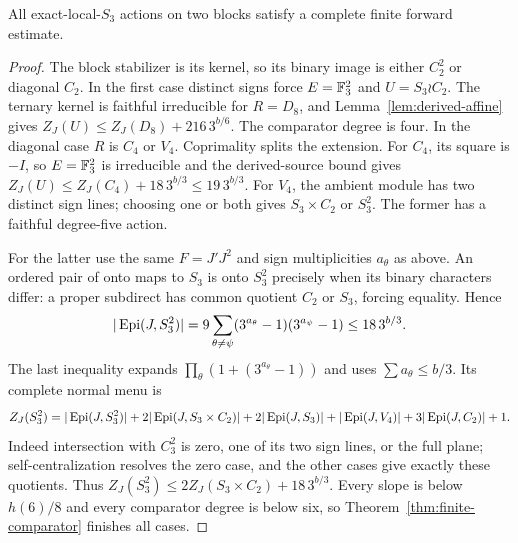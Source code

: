 \begin{proposition}\label{prop:two-s3}
All exact-local-$S_3$ actions on two blocks satisfy a complete finite
forward estimate.
\end{proposition}
\begin{proof}
The block stabilizer is its kernel, so its binary image is either
$C_2^2$ or diagonal $C_2$. In the first case distinct signs force
$E=\mathbb F_3^2$ and $U=S_3\wr C_2$. The ternary kernel is faithful
irreducible for $R=D_8$, and Lemma~\ref{lem:derived-affine} gives
$Z_J(U)\leq Z_J(D_8)+216\,3^{b/6}$. The comparator degree is four.
In the diagonal case $R$ is $C_4$ or $V_4$. Coprimality splits
the extension. For $C_4$, its square is $-I$, so $E=\mathbb F_3^2$ is
irreducible and the derived-source bound gives
$Z_J(U)\leq Z_J(C_4)+18\,3^{b/3}\leq19\,3^{b/3}$.
For $V_4$, the ambient module has two distinct sign lines; choosing
one or both gives $S_3\times C_2$ or $S_3^2$.
The former has a faithful degree-five action.

For the latter use the same $F=J'J^2$ and sign multiplicities
$a_\theta$ as above. An ordered pair of onto maps to $S_3$ is onto
$S_3^2$ precisely when its binary characters differ: a proper
subdirect has common quotient $C_2$ or $S_3$, forcing equality.
Hence
\[
 |\operatorname{Epi}(J,S_3^2)|=9\sum_{\theta\ne\psi}
 (3^{a_\theta}-1)(3^{a_\psi}-1)\leq18\,3^{b/3}.
\]
The last inequality expands $\prod_\theta(1+(3^{a_\theta}-1))$
and uses $\sum a_\theta\leq b/3$. Its complete normal menu is
\[
 Z_J(S_3^2)=|\operatorname{Epi}(J,S_3^2)|+2|\operatorname{Epi}(J,S_3\times C_2)|
 +2|\operatorname{Epi}(J,S_3)|+|\operatorname{Epi}(J,V_4)|+3|\operatorname{Epi}(J,C_2)|+1.
\]
Indeed intersection with $C_3^2$ is zero, one of its two sign
lines, or the full plane; self-centralization resolves the zero
case, and the other cases give exactly these quotients. Thus
$Z_J(S_3^2)\leq2Z_J(S_3\times C_2)+18\,3^{b/3}$.
Every slope is below $h(6)/8$ and every comparator degree is below
six, so Theorem~\ref{thm:finite-comparator} finishes all cases.
\end{proof}

